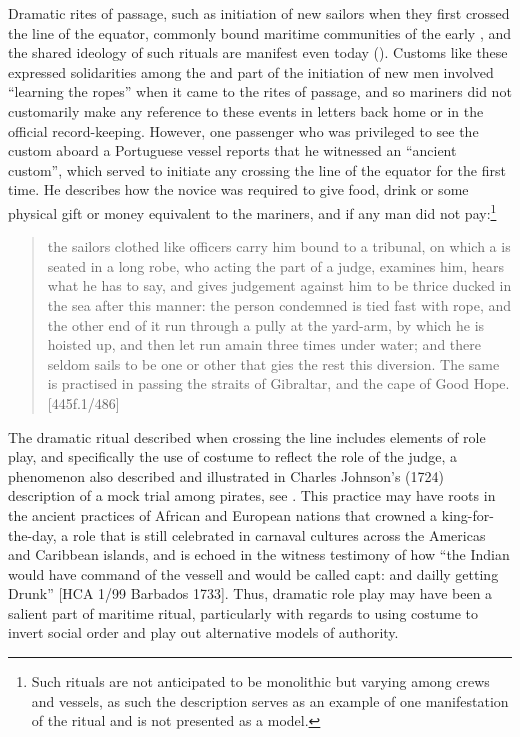 Dramatic rites of passage, such as initiation of new sailors when they first crossed the line of the equator, commonly bound maritime communities of the early , and the shared ideology of such rituals are manifest even today (\citealt{Bronner2006}). Customs like these expressed solidarities among the  and part of the initiation of new men involved “learning the ropes” when it came to the rites of passage, and so mariners did not customarily make any reference to these events in letters back home or in the official record-keeping. However, one passenger who was privileged to see the custom aboard a  Portuguese vessel reports that he witnessed an “ancient custom”, which served to initiate any  crossing the line of the equator for the first time. He describes how the novice  was required to give food, drink or some physical gift or money equivalent to the mariners, and if any man did not pay:\footnote{Such rituals are not anticipated to be monolithic but varying among crews and vessels, as such the description serves as an example of one manifestation of the ritual and is not presented as a model.} 

\begin{quotation}
the sailors clothed like officers carry him bound to a tribunal, on which a  is seated in a long robe, who acting the part of a judge, examines him, hears what he has to say, and gives judgement against him to be thrice ducked in the sea after this manner: the person condemned is tied fast with rope, and the other end of it run through a pully at the yard-arm, by which he is hoisted up, and then let run amain three times under water; and there seldom sails to be one or other that gies the rest this diversion. The same is practised in passing the straits of Gibraltar, and the cape of Good Hope. [445f.1/486] 
\end{quotation}

The dramatic ritual described when crossing the line includes elements of role play, and specifically the use of costume to reflect the role of the judge, a phenomenon also described and illustrated in Charles Johnson's (1724) description of a mock trial among pirates, see . This practice may have roots in the ancient practices of African and European nations that crowned a king-for-the-day, a role that is still celebrated in carnaval cultures across the Americas and Caribbean islands, and is echoed in the witness testimony of how “the Indian would have command of the vessell and would be called capt: and dailly getting Drunk” [HCA 1/99 Barbados {1733}]. Thus, dramatic role play may have been a salient part of maritime ritual, particularly with regards to using costume to invert social order and play out alternative models of authority. 

